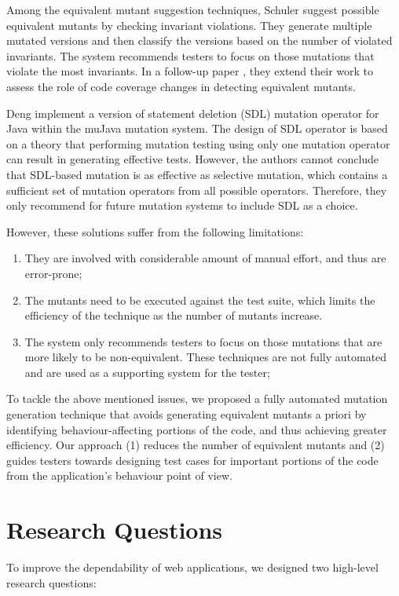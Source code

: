 Among the equivalent mutant suggestion techniques, Schuler \etal \cite{schuler:issta09} suggest possible equivalent mutants by checking invariant violations. They
generate multiple mutated versions and then classify the versions based on the number of violated invariants.
The system recommends testers to focus on those mutations that violate the most invariants.
In a follow-up paper \cite{schuler:tvr12}, they extend their work to assess the role of code coverage changes in detecting equivalent mutants. 

Deng \etal \cite{deng:icst13} implement a version of statement deletion (SDL) mutation operator for Java within the muJava mutation system. The design of SDL operator is based on a theory that performing mutation testing using only one mutation operator can result in generating effective tests. However, the authors cannot conclude that SDL-based mutation is as effective as selective mutation, which contains a sufficient set of mutation operators from all possible operators. Therefore, they only recommend for future mutation systems to include SDL as a choice. 

However, these solutions suffer from the following limitations:
\begin{enumerate}
\item They are involved with considerable amount of manual effort, and thus are error-prone;
\item The mutants need to be executed against the test suite, which limits the efficiency of the technique as the number of mutants increase.
\item The system only recommends testers to focus on those mutations that are more likely to be non-equivalent. These techniques are not fully automated and are used as a supporting system for the tester;  
\end{enumerate}
To tackle the above mentioned issues, we proposed a fully automated mutation generation technique that avoids generating equivalent mutants a priori by identifying behaviour-affecting portions of the code, and thus achieving greater efficiency. 
Our approach (1) reduces the number of equivalent mutants and (2) guides testers towards designing test cases for important portions of the code from the application's behaviour point of view.  
 
\section{Research Questions} \label{Sec:researchq}
To improve the dependability of \javascript web applications, we designed two high-level research questions: 

